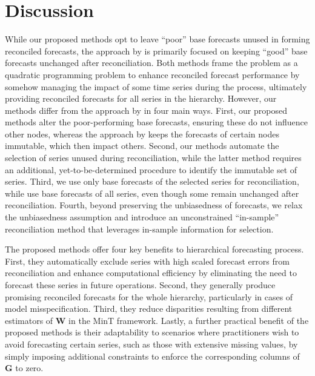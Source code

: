 \documentclass[
  11pt]{article}
\theoremstyle{plain}
\theoremstyle{remark}
\begin{document}
\section{Discussion}\label{sec-discussion}

While our proposed methods opt to leave ``poor'' base forecasts unused
in forming reconciled forecasts, the approach by \citet{Zhang2023-op} is
primarily focused on keeping ``good'' base forecasts unchanged after
reconciliation. Both methods frame the problem as a quadratic
programming problem to enhance reconciled forecast performance by
somehow managing the impact of some time series during the process,
ultimately providing reconciled forecasts for all series in the
hierarchy. However, our methods differ from the approach by
\citet{Zhang2023-op} in four main ways. First, our proposed methods
alter the poor-performing base forecasts, ensuring these do not
influence other nodes, whereas the approach by \citet{Zhang2023-op}
keeps the forecasts of certain nodes immutable, which then impact
others. Second, our methods automate the selection of series unused
during reconciliation, while the latter method requires an additional,
yet-to-be-determined procedure to identify the immutable set of series.
Third, we use only base forecasts of the selected series for
reconciliation, while \citet{Zhang2023-op} use base forecasts of all
series, even though some remain unchanged after reconciliation. Fourth,
beyond preserving the unbiasedness of forecasts, we relax the
unbiasedness assumption and introduce an unconstrained ``in-sample''
reconciliation method that leverages in-sample information for
selection.

The proposed methods offer four key benefits to hierarchical forecasting
process. First, they automatically exclude series with high scaled
forecast errors from reconciliation and enhance computational efficiency
by eliminating the need to forecast these series in future operations.
Second, they generally produce promising reconciled forecasts for the
whole hierarchy, particularly in cases of model misspecification. Third,
they reduce disparities resulting from different estimators of
\(\bm{W}\) in the MinT framework. Lastly, a further practical benefit of
the proposed methods is their adaptability to scenarios where
practitioners wish to avoid forecasting certain series, such as those
with extensive missing values, by simply imposing additional constraints
to enforce the corresponding columns of \(\bm{G}\) to zero.
\end{document}
